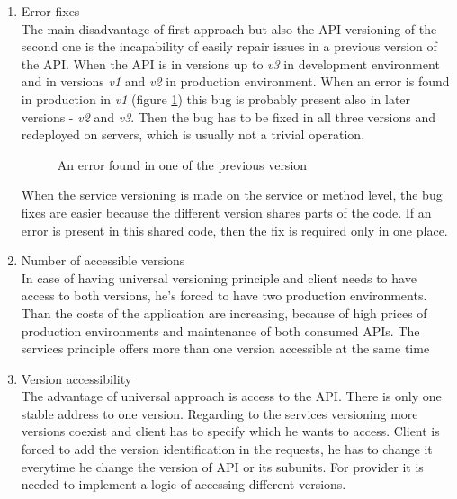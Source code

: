 \begin{enumerate}
  \item {Error fixes} \\
The main disadvantage of first approach but also the API versioning of the second one is the incapability of easily repair issues in a previous version of the API. When the API is in versions up to \emph{v3} in development environment and in versions \emph{v1} and \emph{v2} in production environment. When an error is found in production in \emph{v1} (figure \ref{fig:bug-in-previous-version}) this bug is probably present also in later versions - \emph{v2} and \emph{v3}. Then the bug has to be fixed in all three versions and redeployed on servers, which is usually not a trivial operation.
\begin{figure}[htp] 
\caption{An error found in one of the previous version}
\label{fig:bug-in-previous-version}
\end{figure} 

When the service versioning is made on the service or method level, the bug fixes are easier because the different version shares parts of the code. If an error is present in this shared code, then the fix is required only in one place.


\item{Number of accessible versions} \\
In case of having universal versioning principle and client needs to have access to both versions, he's forced to have two production environments. Than the costs of the application are increasing, because of high prices of production environments and maintenance of both consumed APIs. The services principle offers more than one version accessible at the same time


\item{Version accessibility} \\
The advantage of universal approach is access to the API. There is only one stable address to one version. Regarding to the services versioning more versions coexist and client has to specify which he wants to access. Client is forced to add the version identification in the requests, he has to change it everytime he change the version of API or its subunits. For provider it is needed to implement a logic of accessing different versions.

\end{enumerate}





